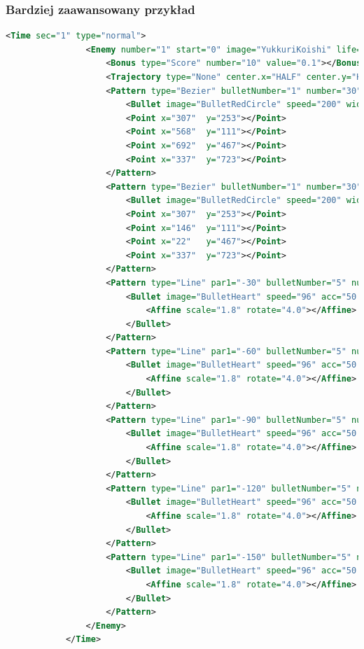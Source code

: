 		\subsubsection{Bardziej zaawansowany przykład}
		\begin{lstlisting}[language=xml]
			<Time sec="1" type="normal">
				<Enemy number="1" start="0" image="YukkuriKoishi" life="4000" speed="0" length="500">
					<Bonus type="Score" number="10" value="0.1"></Bonus>
					<Trajectory type="None" center.x="HALF" center.y="HALF" a="0"></Trajectory>
					<Pattern type="Bezier" bulletNumber="1" number="30" interval="0.20">
						<Bullet image="BulletRedCircle" speed="200" width="40" height="40" hitboxSize="FULL"></Bullet>
						<Point x="307"  y="253"></Point>
						<Point x="568"  y="111"></Point>
						<Point x="692"  y="467"></Point>
						<Point x="337"  y="723"></Point>
					</Pattern>
					<Pattern type="Bezier" bulletNumber="1" number="30" interval="0.20">
						<Bullet image="BulletRedCircle" speed="200" width="40" height="40" hitboxSize="FULL"></Bullet>
						<Point x="307"  y="253"></Point>
						<Point x="146"  y="111"></Point>
						<Point x="22"   y="467"></Point>
						<Point x="337"  y="723"></Point>
					</Pattern>
					<Pattern type="Line" par1="-30" bulletNumber="5" number="5" interval="1.0">
						<Bullet image="BulletHeart" speed="96" acc="50.0" width="32" height="32" hitboxSize="HALF">
							<Affine scale="1.8" rotate="4.0"></Affine>
						</Bullet>
					</Pattern>
					<Pattern type="Line" par1="-60" bulletNumber="5" number="5" interval="1.0">
						<Bullet image="BulletHeart" speed="96" acc="50.0" width="32" height="32" hitboxSize="HALF">
							<Affine scale="1.8" rotate="4.0"></Affine>
						</Bullet>
					</Pattern>
					<Pattern type="Line" par1="-90" bulletNumber="5" number="5" interval="1.0">
						<Bullet image="BulletHeart" speed="96" acc="50.0" width="32" height="32" hitboxSize="HALF">
							<Affine scale="1.8" rotate="4.0"></Affine>
						</Bullet>
					</Pattern>
					<Pattern type="Line" par1="-120" bulletNumber="5" number="5" interval="1.0">
						<Bullet image="BulletHeart" speed="96" acc="50.0" width="32" height="32" hitboxSize="HALF">
							<Affine scale="1.8" rotate="4.0"></Affine>
						</Bullet>
					</Pattern>
					<Pattern type="Line" par1="-150" bulletNumber="5" number="5" interval="1.0">
						<Bullet image="BulletHeart" speed="96" acc="50.0" width="32" height="32" hitboxSize="HALF">
							<Affine scale="1.8" rotate="4.0"></Affine>
						</Bullet>
					</Pattern>
				</Enemy>
			</Time>
		\end{lstlisting}
